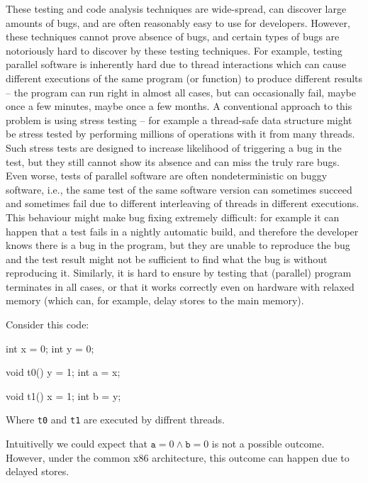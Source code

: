 These testing and code analysis techniques are wide-spread, can discover large amounts of bugs, and are often reasonably easy to use for developers.
However, these techniques cannot prove absence of bugs, and certain types of bugs are notoriously hard to discover by these testing techniques.
For example, testing parallel software is inherently hard due to thread interactions which can cause different executions of the same program (or function) to produce different results -- the program can run right in almost all cases, but can occasionally fail, maybe once a few minutes, maybe once a few months.
A conventional approach to this problem is using stress testing -- for example a thread-safe data structure might be stress tested by performing millions of operations with it from many threads.
Such stress tests are designed to increase likelihood of triggering a bug in the test, but they still cannot show its absence and can miss the truly rare bugs.
Even worse, tests of parallel software are often nondeterministic on buggy software, i.e., the same test of the same software version can sometimes succeed and sometimes fail due to different interleaving of threads in different executions.
This behaviour might make bug fixing extremely difficult: for example it can happen that a test fails in a nightly automatic build, and therefore the developer knows there is a bug in the program, but they are unable to reproduce the bug and the test result might not be sufficient to find what the bug is without reproducing it.
Similarly, it is hard to ensure by testing that (parallel) program terminates in all cases, or that it works correctly even on hardware with relaxed memory (which can, for example, delay stores to the main memory).\begin{marginnote}%
Consider this code:

\begin{cppcode}
int x = 0;
int y = 0;

void t0() {
  y = 1;
  int a = x;
}

void t1() {
  x = 1;
  int b = y;
}
\end{cppcode}

Where \texttt{t0} and \texttt{t1} are executed by diffrent threads.

Intuitivelly we could expect that $\texttt{a} = 0 \land \texttt{b} = 0$ is not a possible outcome.
However, under the common x86 architecture, this outcome can happen due to delayed stores.
\end{marginnote}

